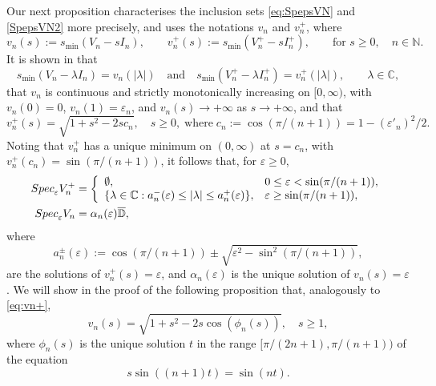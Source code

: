 \documentclass[preprint,1p,11pt]{elsarticle}
\newcommand\C{{\mathbb C}}
\newcommand\D{{\mathbb D}}
\newcommand\N{{\mathbb N}}
\newcommand\eps{{\varepsilon}}
\newcommand\Speps{{\rm Spec}_\eps}
\numberwithin{equation}{section}   %
\numberwithin{figure}{section}  %
\begin{document}
Our next proposition characterises the inclusion sets \eqref{eq:SpepsVN} and \eqref{SpepsVN2} more precisely, and uses the notations $v_n$ and $v_n^+$, where
$$
v_n(s) := s_{\min}(V_n-sI_n), \qquad v^+_n(s) := s_{\min}(V^+_n-sI^+_n), \qquad \mbox{for } s\geq 0, \quad n\in \N.
$$
It is shown in \cite[\S8.1]{CW.Heng.ML:SpecIncl1} that
$$
s_{\min}(V_n-\lambda I_n) = v_n(|\lambda|) \quad \mbox{and} \quad s_{\min}(V^+_n-\lambda I^+_n) = v^+_n(|\lambda|), \qquad \lambda\in \C,
$$ 
that
$v_n$ is continuous and strictly monotonically increasing on $[0,\infty)$, with $v_n(0)=0$, $v_n(1)=\eps_n$, and $v_n(s)\to+\infty$ as $s\to +\infty$, and that
\begin{equation} \label{eq:vn+}
v_n^+(s) = \sqrt{1+s^2-2s c_n}, \quad s\geq 0, \; \mbox{where} \; c_n := \cos(\pi/(n+1))=1-(\eps'_n)^2/2.
\end{equation}
Noting that $v_n^+$ has a unique minimum on $(0,\infty)$ at $s=c_n$, with  $v_n^+(c_n) = \sin(\pi/(n+1))$, it follows that, for $\eps\geq 0$, 
\begin{equation} \label{eq:chara}
\begin{aligned}
\Speps V^+_n &= \left\{\begin{array}{ll}\emptyset, & 0\leq \eps < \sin(\pi/(n+1)),\\
\{\lambda\in \C:a^-_n(\eps) \leq |\lambda| \leq a^+_n(\eps)\}, & \eps \geq \sin(\pi/(n+1)), \end{array}\right.\\ 
\Speps V_n &= \alpha_n(\eps) \overline{\D},
\end{aligned}
\end{equation}
where 
$$
a^\pm_n(\eps) := \cos(\pi/(n+1))\pm \sqrt{\eps^2-\sin^2(\pi/(n+1))},
$$
are the solutions of $v_n^+(s)=\eps$, and $\alpha_n(\eps)$ is the unique solution of $v_n(s)=\eps$. We will show in the proof of the following proposition that, analogously to \eqref{eq:vn+},
 \begin{equation} \label{eq:vn}
v_n(s) = \sqrt{1+s^2-2s \cos(\phi_n(s))}, \quad s\geq 1, 
\end{equation}
where $\phi_n(s)$ is the unique solution $t$ in the range $[\pi/(2n+1),\pi/(n+1))$ of the equation
\begin{equation} \label{eq:phi}
s\sin((n+1)t)=\sin(nt).
\end{equation}
\end{document}
